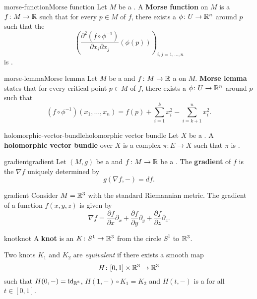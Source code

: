 \begin{topic}{morse-function}{Morse function}
    Let $M$ be a . A \textbf{Morse function} on $M$ is a  $f \colon M \to \mathbb{R}$ such that for every  $p \in M$ of $f$, there exists a  $\phi \colon U \to \mathbb{R}^n$ around $p$ such that the 
    \[ \left( \frac{\partial^2 (f \circ \phi^{-1})}{\partial x_i \partial x_j} (\phi(p)) \right)_{i, j = 1, \ldots, n} \]
    is .
\end{topic}

\begin{topic}{morse-lemma}{Morse lemma}
    Let $M$ be a  and $f \colon M \to \mathbb{R}$ a  on $M$. \textbf{Morse lemma} states that for every critical point $p \in M$ of $f$, there exists a  $\phi \colon U \to \mathbb{R}^n$ around $p$ such that
    \[ (f \circ \phi^{-1})(x_1, \ldots, x_n) = f(p) + \sum_{i = 1}^{k} x_i^2 - \sum_{i = k + 1}^{n} x_i^2 . \]
\end{topic}

\begin{topic}{holomorphic-vector-bundle}{holomorphic vector bundle}
    Let $X$ be a . A \textbf{holomorphic vector bundle} over $X$ is a complex  $\pi \colon E \to X$ such that $\pi$ is .
\end{topic}

\begin{topic}{gradient}{gradient}
    Let $(M, g)$ be a  and $f \colon M \to \mathbb{R}$ be a . The \textbf{gradient} of $f$ is the  $\nabla f$ uniquely determined by
    \[ g(\nabla f, -) = df . \]
\end{topic}

\begin{example}{gradient}
    Consider $M = \mathbb{R}^3$ with the standard Riemannian metric. The gradient of a function $f(x, y, z)$ is given by
    \[ \nabla f = \frac{\partial f}{\partial x} \partial_x + \frac{\partial f}{\partial y} \partial_y + \frac{\partial f}{\partial z} \partial_z . \]
\end{example}

\begin{topic}{knot}{knot}
    A \textbf{knot} is an  $K \colon S^1 \to \mathbb{R}^3$ from the circle $S^1$ to $\mathbb{R}^3$.

    Two knots $K_1$ and $K_2$ are \textit{equivalent} if there exists a smooth map
    \[ H \colon [0, 1] \times \mathbb{R}^3 \to \mathbb{R}^3 \]
    such that $H(0, -) = \textup{id}_{\mathbb{R}^3}$, $H(1, -) \circ K_1 = K_2$ and $H(t, -)$ is a  for all $t \in [0, 1]$.
\end{topic}

